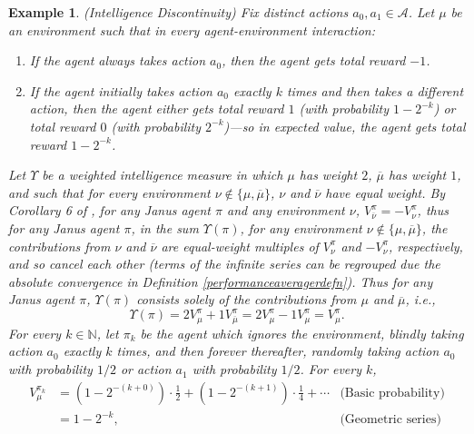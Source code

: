 \documentclass[twoside]{article}
\newtheorem{example}[theorem]{Example}
\begin{document}
\begin{example}
    (Intelligence Discontinuity)
    Fix distinct actions $a_0,a_1\in\mathcal A$.
    Let $\mu$ be an environment such that in every agent-environment interaction:
    \begin{enumerate}
        \item If the agent always takes action $a_0$, then the agent gets total reward $-1$.
        \item If the agent initially takes action $a_0$ exactly $k$ times and
            then takes a different action, then the agent either
            gets total reward $1$ (with probability $1-2^{-k}$)
            or total reward $0$ (with probability $2^{-k}$)---so in expected
            value, the agent gets total reward $1-2^{-k}$.
    \end{enumerate}
    Let $\Upsilon$ be a weighted intelligence measure in which $\mu$ has weight $2$,
    $\overline\mu$ has weight $1$, and such that for every
    environment $\nu\not\in\{\mu,\overline{\mu}\}$, $\nu$ and $\overline{\nu}$ have
    equal weight.
    By Corollary 6 of \cite{alexander2021reward}, for any Janus agent $\pi$ and
    any environment $\nu$, $V^\pi_{\overline\nu}=-V^\pi_{\nu}$, thus for any Janus agent $\pi$,
    in the sum $\Upsilon(\pi)$, for any environment $\nu\not\in\{\mu,\overline{\mu}\}$,
    the contributions from $\nu$ and $\overline\nu$ are equal-weight multiples of
    $V^\pi_{\nu}$ and $-V^\pi_{\nu}$,
    respectively, and so cancel each other
    (terms of the infinite series can be regrouped due the absolute convergence
    in Definition \ref{performanceaveragerdefn}).
    Thus for any Janus agent $\pi$,
    $\Upsilon(\pi)$ consists solely of the contributions from $\mu$ and $\overline\mu$,
    i.e.,
    \[
        \Upsilon(\pi)=2V^\pi_\mu+1V^\pi_{\overline\mu}
        =2V^\pi_\mu-1V^\pi_{\mu}=V^\pi_\mu.
    \]
    For every $k\in\mathbb N$, let $\pi_k$ be the agent which ignores the environment,
    blindly taking action $a_0$ exactly $k$ times, and then forever thereafter,
    randomly taking action $a_0$ with probability $1/2$ or action $a_1$ with probability
    $1/2$.
    For every $k$,
    \begin{align*}
        V^{\pi_k}_\mu
            &= (1-2^{-(k+0)})\cdot \mbox{$\frac12$}
                +(1-2^{-(k+1)})\cdot\mbox{$\frac14$} + \cdots
                    &\mbox{(Basic probability)}\\
            &= 1-2^{-k},
                    &\mbox{(Geometric series)}
    \end{align*}

\end{example}
\end{document}
